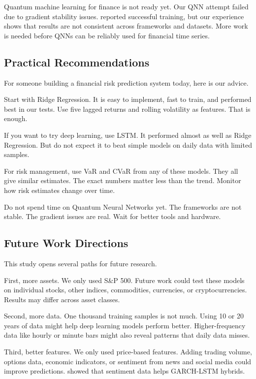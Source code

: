 \documentclass[12pt,a4paper]{article}
\begin{document}
Quantum machine learning for finance is not ready yet. Our QNN attempt failed due to gradient stability issues. \citet{chen2025} reported successful training, but our experience shows that results are not consistent across frameworks and datasets. More work is needed before QNNs can be reliably used for financial time series.

\subsection{Practical Recommendations}
For someone building a financial risk prediction system today, here is our advice.

Start with Ridge Regression. It is easy to implement, fast to train, and performed best in our tests. Use five lagged returns and rolling volatility as features. That is enough.

If you want to try deep learning, use LSTM. It performed almost as well as Ridge Regression. But do not expect it to beat simple models on daily data with limited samples.

For risk management, use VaR and CVaR from any of these models. They all give similar estimates. The exact numbers matter less than the trend. Monitor how risk estimates change over time.

Do not spend time on Quantum Neural Networks yet. The frameworks are not stable. The gradient issues are real. Wait for better tools and hardware.

\subsection{Future Work Directions}
This study opens several paths for future research.

First, more assets. We only used S\&P 500. Future work could test these models on individual stocks, other indices, commodities, currencies, or cryptocurrencies. Results may differ across asset classes.

Second, more data. One thousand training samples is not much. Using 10 or 20 years of data might help deep learning models perform better. Higher-frequency data like hourly or minute bars might also reveal patterns that daily data misses.

Third, better features. We only used price-based features. Adding trading volume, options data, economic indicators, or sentiment from news and social media could improve predictions. \citet{leber2025} showed that sentiment data helps GARCH-LSTM hybrids.
\end{document}
